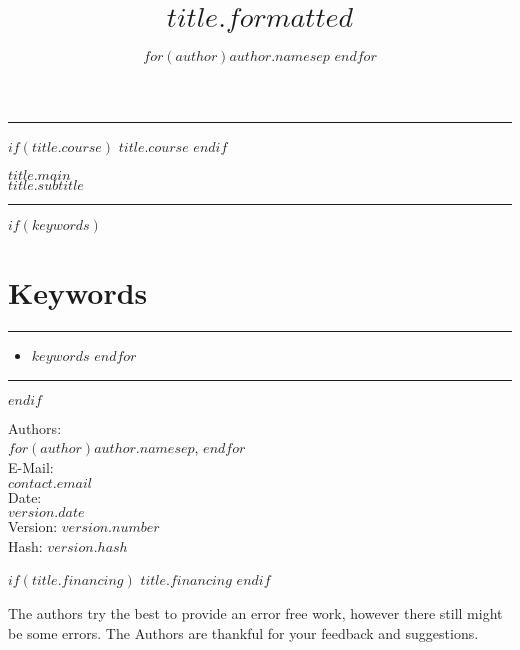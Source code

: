 \documentclass[12pt,a4paper, twoside=false]{scrartcl}
\author{
$for(author)$$author.name$$sep$ \And $endfor$
}
\title{$title.formatted$}
\providecommand{\Keywords}{%
\section*{Keywords}%
\begin{minipage}{\textwidth}%
\hrule%
\begin{multicols}{3}%
\begin{itemize}[leftmargin=0mm]%
$for(keywords)$\item[] $keywords$ $endfor$
\end{itemize}%
\end{multicols}%
\vspace{-2mm}%
\hrule%
\end{minipage}%
\needspace{.25\textheight}%
}
\begin{document}
\begin{titlepage}

\par
{}%
\hfill
{}%
\par

\begin{center}

\noindent\rule{\textwidth}{0.4pt}


$if(title.course)$
\vspace{0.5 cm} {\large \textsf{$title.course$}}
$endif$


\vspace{0.5 cm} {\LARGE \textbf{ \textsf{$title.main$}}}\\
\vspace{0.5 cm} {\Large \textsf{$title.subtitle$}}


\noindent\rule{\textwidth}{0.4pt}
\setcounter{tocdepth}{3}
\tableofcontents


$if(keywords)$
\Keywords
$endif$

\end{center}


 \begin{center}
  	\vspace{1 cm}Authors: \\ \vspace{2 mm}$for(author)$$author.name$$sep$, $endfor$ \\
  	\vspace{0.5cm}E-Mail: \\ \vspace{2 mm} $contact.email$ \\
   	\vspace{0.5 cm}Date: \\ \vspace{2 mm} $version.date$ \\
   	\vspace{0.5 cm}  Version: $version.number$\\
   	\vspace{2 mm}  Hash: $version.hash$

$if(title.financing)$
	\vspace{0.5 cm}  $title.financing$
$endif$

	\vspace{0.5 cm}
    The authors try the best to provide an error free work, however there still might be some errors. The Authors are thankful for your feedback and suggestions.
    \vfill
   	\end{center}


\end{titlepage}
\end{document}

